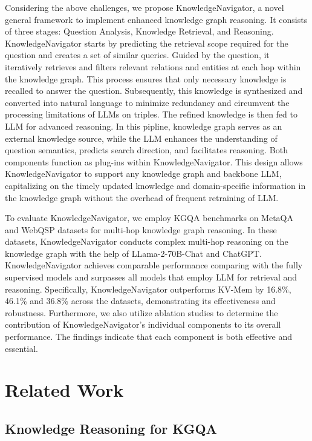 \documentclass{article}
\begin{document}
Considering the above challenges, we propose KnowledgeNavigator, a novel general framework to implement enhanced knowledge graph reasoning. It consists of three stages: Question Analysis, Knowledge Retrieval, and Reasoning. KnowledgeNavigator starts by predicting the retrieval scope required for the question and creates a set of similar queries. Guided by the question, it iteratively retrieves and filters relevant relations and entities at each hop within the knowledge graph. This process ensures that only necessary knowledge is recalled to answer the question. Subsequently, this knowledge is  synthesized and converted into natural language to minimize redundancy and circumvent the processing limitations of LLMs on triples. The refined knowledge is then fed to LLM for advanced reasoning. In this pipline, knowledge graph serves as an external knowledge source, while the LLM enhances the understanding of  question semantics, predicts search direction, and facilitates reasoning. Both components function as plug-ins within KnowledgeNavigator. This design allows KnowledgeNavigator to support any knowledge graph and backbone LLM, capitalizing on the timely updated knowledge and domain-specific information in the knowledge graph without the overhead of  frequent retraining of LLM.




To evaluate KnowledgeNavigator, we employ KGQA benchmarks on MetaQA and WebQSP datasets for multi-hop knowledge graph reasoning. In these datasets, KnowledgeNavigator conducts complex multi-hop reasoning on the knowledge graph with the help of LLama-2-70B-Chat and ChatGPT. KnowledgeNavigator achieves comparable performance comparing with the fully supervised models and surpasses all models that employ LLM for retrieval and reasoning. Specifically, KnowledgeNavigator outperforms KV-Mem by 16.8\%, 46.1\% and 36.8\% across the  datasets, demonstrating its effectiveness and robustness. Furthermore, we also utilize ablation studies to determine the contribution of KnowledgeNavigator's individual components to its overall performance. The findings indicate that each component is both effective and essential.

\section{Related Work}

\subsection{Knowledge Reasoning for KGQA}
\end{document}
